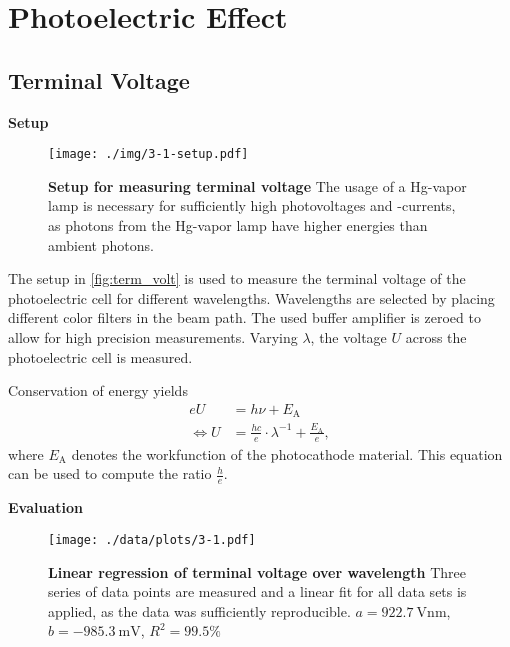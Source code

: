 \chapter{Photoelectric Effect}


\section{Terminal Voltage}\label{sec:term_volt}%

\textbf{Setup}\\
\begin{figure}[tbp]
	\centering
	\texttt{[image: ./img/3-1-setup.pdf]}
	\caption[Setup for measuring terminal voltage]{\textbf{Setup for measuring terminal voltage} The usage of a Hg-vapor lamp is necessary for sufficiently high photovoltages and -currents, as photons from the Hg-vapor lamp have higher energies than ambient photons.}
	\label{fig:term_volt}
\end{figure}
The setup in \autoref{fig:term_volt} is used to measure the terminal voltage of the photoelectric cell for different wavelengths.
Wavelengths are selected by placing different color filters in the beam path.
The used buffer amplifier is zeroed to allow for high precision measurements.
Varying $\lambda$, the voltage $U$ across the photoelectric cell is measured.

Conservation of energy yields
\begin{align}
	eU &= h\nu+E_\text{A} \nonumber \\
	\Leftrightarrow U &= \frac{hc}{e}\cdot\lambda^{-1}+\frac{E_\text{A}}{e}, \label{eq:energy_balance}
\end{align}
where $E_\text{A}$ denotes the workfunction of the photocathode material.
This equation can be used to compute the ratio $\frac{h}{e}$.

\textbf{Evaluation}\\
\begin{figure}[tbp]
	\centering
	\texttt{[image: ./data/plots/3-1.pdf]}
	\caption[Linear regression of terminal voltage over wavelength]{\textbf{Linear regression of terminal voltage over wavelength} Three series of data points are measured and a linear fit for all data sets is applied, as the data was sufficiently reproducible. $a=\SI{922.7}{\volt\nm}$, $b=\SI{-985.3}{\milli\V}$, $R^2=99.5\%$}
	\label{fig:linreg_term_volt}
\end{figure}

